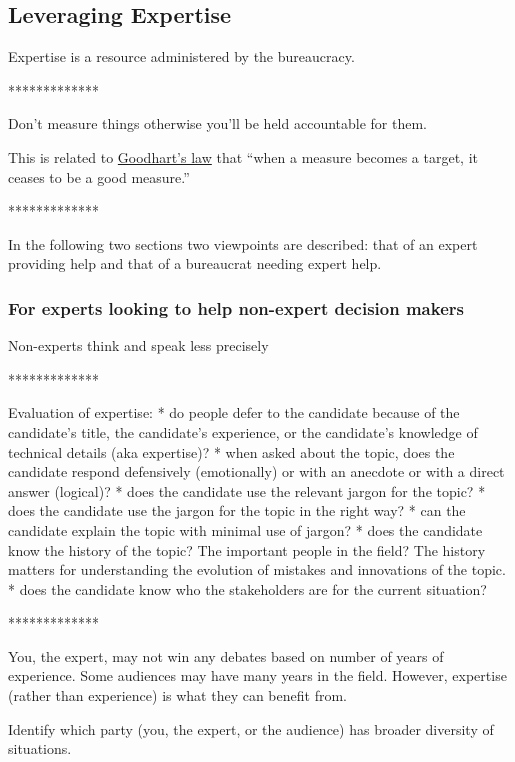 \subsection{Leveraging Expertise\label{sec:expertise}}

Expertise is a resource administered by the bureaucracy.

*************

Don't measure things otherwise you'll be held accountable for them.

This is related to \href{https://en.wikipedia.org/wiki/Goodhart\%27s_law}{Goodhart's law} that ``when a measure becomes a target, it ceases to be a good measure.''

*************

In the following two sections two viewpoints are described: that of an expert providing help and that of a bureaucrat needing expert help. 

\subsubsection{For experts looking to help non-expert decision makers}

Non-experts think and speak less precisely

*************

Evaluation of expertise:
* do people defer to the candidate because of the candidate's title, the candidate's experience, or the candidate's knowledge of technical details (aka expertise)?
* when asked about the topic, does the candidate respond defensively (emotionally) or with an anecdote or with a direct answer (logical)?
* does the candidate use the relevant jargon for the topic?
* does the candidate use the jargon for the topic in the right way?
* can the candidate explain the topic with minimal use of jargon?
* does the candidate know the history of the topic? The important people in the field? The history matters for understanding the evolution of mistakes and innovations of the topic.
* does the candidate know who the stakeholders are for the current situation? 

*************

You, the expert, may not win any debates based on number of years of experience. Some audiences may have many years in the field. However, expertise (rather than experience) is what they can benefit from. 

Identify which party (you, the expert, or the audience) has broader diversity of situations.

